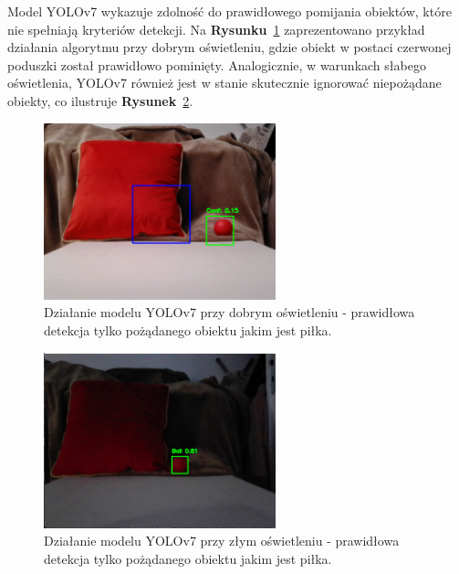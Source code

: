 \documentclass[a4paper,twoside,12pt]{book}
\begin{document}
\newpage
Model YOLOv7 wykazuje zdolność do prawidłowego pomijania obiektów, które nie spełniają kryteriów detekcji. Na \textbf{Rysunku}~\ref{fig:yolov7_good_light_good_object} zaprezentowano przykład działania algorytmu przy dobrym oświetleniu, gdzie obiekt w postaci czerwonej poduszki został prawidłowo pominięty. Analogicznie, w warunkach słabego oświetlenia, YOLOv7 również jest w stanie skutecznie ignorować niepożądane obiekty, co ilustruje \textbf{Rysunek}~\ref{fig:yolov7_bad_light_good_object}.

\begin{figure}[!hb]
    \centering
    \includegraphics[width=0.6\textwidth]{Images/Porownanie/Yolo7 robot/Zrzut ekranu 2025-01-02 194354.png}
    \caption{Działanie modelu YOLOv7 przy dobrym oświetleniu - prawidłowa detekcja tylko pożądanego obiektu jakim jest piłka.}
    \label{fig:yolov7_good_light_good_object}
\end{figure}
\begin{figure}[h]
    \centering
    \includegraphics[width=0.6\textwidth]{Images/Porownanie/Yolo7 robot/Zrzut ekranu 2025-01-02 194641.png}
    \caption{Działanie modelu YOLOv7 przy złym oświetleniu - prawidłowa detekcja tylko pożądanego obiektu jakim jest piłka.}
    \label{fig:yolov7_bad_light_good_object}
\end{figure}

\newpage
\end{document}

